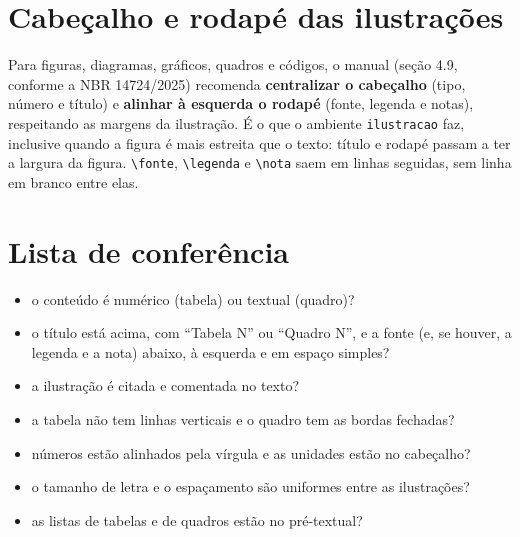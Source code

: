 \section{Cabeçalho e rodapé das ilustrações}

Para figuras, diagramas, gráficos, quadros e códigos, o manual (seção 4.9, conforme a
NBR 14724/2025) recomenda \textbf{centralizar o cabeçalho} (tipo, número e título) e
\textbf{alinhar à esquerda o rodapé} (fonte, legenda e notas), respeitando as margens da
ilustração. É o que o ambiente \texttt{ilustracao} faz, inclusive quando a figura é mais
estreita que o texto: título e rodapé passam a ter a largura da figura. \texttt{\textbackslash fonte},
\texttt{\textbackslash legenda} e \texttt{\textbackslash nota} saem em linhas seguidas, sem
linha em branco entre elas.


\section{Lista de conferência}

\begin{itemize}
  \item o conteúdo é numérico (tabela) ou textual (quadro)?
  \item o título está acima, com ``Tabela N'' ou ``Quadro N'', e a fonte (e, se houver, a
        legenda e a nota) abaixo, à esquerda e em espaço simples?
  \item a ilustração é citada e comentada no texto?
  \item a tabela não tem linhas verticais e o quadro tem as bordas fechadas?
  \item números estão alinhados pela vírgula e as unidades estão no cabeçalho?
  \item o tamanho de letra e o espaçamento são uniformes entre as ilustrações?
  \item as listas de tabelas e de quadros estão no pré-textual?
\end{itemize}
